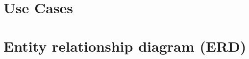 \section{Use Cases}\label{sec:use-cases}
\lipsum[2-3]

\section{Entity relationship diagram (ERD)}\label{sec:entity-relationship-diagram-(erd)}
\lipsum[2-3]
